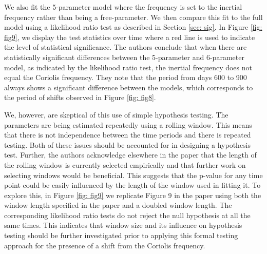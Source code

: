 \documentclass{stat572Style}
\begin{document}
   
   

\par We also fit the 5-parameter model where the frequency is set to the inertial frequency rather than being a free-parameter. 
We then compare this fit to the full model using a likelihood ratio test as described in Section \ref{sec: sig}.
 In Figure \ref{fig: fig9}, we display the test statistics over time where a red line is used to indicate the level of statistical significance. 
The authors conclude that when there are statistically significant differences between the 5-parameter and 6-parameter model, as indicated by the likelihood ratio test,   the inertial frequency does not equal the Coriolis frequency.   
They note that the period from days 600 to 900 always shows a significant difference between the models, which corresponds to the period of shifts observed in Figure \ref{fig: fig8}.

\par We, however, are skeptical of this use of simple hypothesis testing. 
The parameters are being estimated repeatedly using a rolling window. 
This means that there is not independence between the time periods and there is repeated testing. 
Both of these issues should be accounted for in designing a hypothesis test. 
Further, the authors acknowledge elsewhere in the paper that the length of the rolling window is currently selected empirically and that further work on selecting windows would be beneficial. 
This suggests that the p-value for any time point could be easily influenced by the length of the window used in fitting it.
To explore this, in Figure \ref{fig: fig9} we replicate Figure 9  in the paper using both the window length specified in the paper and a doubled window length.
The corresponding likelihood ratio tests do not reject the null hypothesis at all the same times. 
This indicates that window size and its influence on hypothesis testing should be further investigated prior to applying this formal testing approach for the presence of a shift from the Coriolis frequency. 
\end{document}
